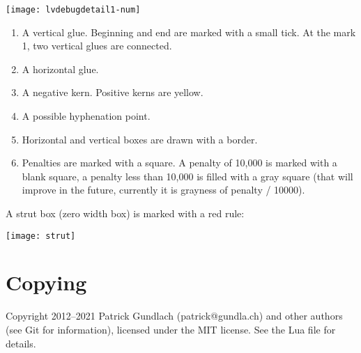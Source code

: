 \documentclass{article}
\begin{document}
\noindent\texttt{[image: lvdebugdetail1-num]}
\begin{enumerate}
	\item A vertical glue. Beginning and end are marked with a small tick. At the mark 1, two vertical glues are connected.
\item A horizontal glue.
\item A negative kern. Positive kerns are yellow.
\item A possible hyphenation point.
\item Horizontal and vertical boxes are drawn with a border.
\item Penalties are marked with a square. A penalty of 10,000 is marked with a blank square, a penalty less than 10,000 is filled with a gray square (that will improve in the future, currently it is grayness of penalty / 10000).
\end{enumerate}

A strut box (zero width box) is marked with a red rule:

\noindent\texttt{[image: strut]}



\section{Copying}

Copyright 2012–2021 Patrick Gundlach (patrick@gundla.ch) and other authors (see Git for information), licensed under the MIT license. See the Lua file for details.
\end{document}

